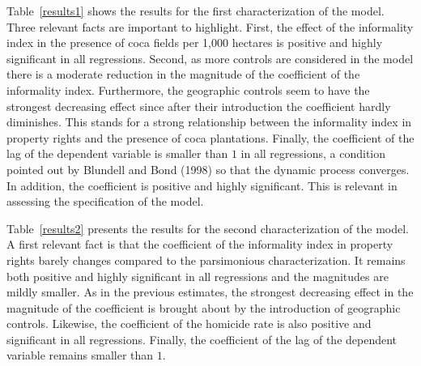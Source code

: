 \documentclass[a4paper, 12pt]{article}
\begin{document}
Table~\ref{results1} shows the results for the first characterization of the model. Three relevant facts are important to highlight. First, the effect of the informality index in the presence of coca fields per 1,000 hectares is positive and highly significant in all regressions. Second, as more controls are considered in the model there is a moderate reduction in the magnitude of the coefficient of the informality index. Furthermore, the geographic controls seem to have the strongest decreasing effect since after their introduction the coefficient hardly diminishes. This stands for a strong relationship between the informality index in property rights and the presence of coca plantations. Finally, the coefficient of the lag of the dependent variable is smaller than $1$ in all regressions, a condition pointed out by Blundell and Bond (1998) so that the dynamic process converges. In addition, the coefficient is positive and highly significant. This is relevant in assessing the specification of the model.

Table~\ref{results2} presents the results for the second characterization of the model. A first relevant fact is that the coefficient of the informality index in property rights barely changes compared to the parsimonious characterization. It remains both positive and highly significant in all regressions and the magnitudes are mildly smaller. As in the previous estimates, the strongest decreasing effect in the magnitude of the coefficient is brought about by the introduction of geographic controls. Likewise, the coefficient of the homicide rate is also positive and significant in all regressions. Finally, the coefficient of the lag of the dependent variable remains smaller than $1$.
\end{document}
